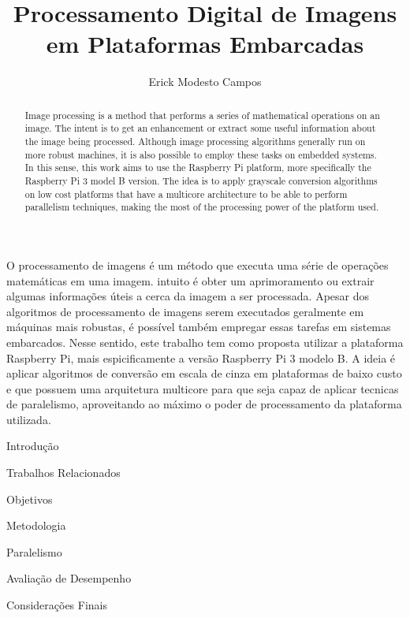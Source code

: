 \documentclass[12pt]{article}
\title{Processamento Digital de Imagens em Plataformas Embarcadas}
\author{Erick Modesto Campos}
\begin{document}
 

\onehalfspace
\maketitle

\begin{abstract}
Image processing is a method that performs a series of mathematical operations
on an image. The intent is to get an enhancement or extract some useful
information about the image being processed. Although image processing
algorithms generally run on more robust machines, it is also possible to employ
these tasks on embedded systems. In this sense, this work aims to use the
Raspberry Pi platform, more specifically the Raspberry Pi 3 model B version. The
idea is to apply grayscale conversion algorithms on low cost platforms that have
a multicore architecture to be able to perform parallelism techniques, making
the most of the processing power of the platform used.
\end{abstract}
     
\begin{resumo} 
O processamento de imagens é um método que executa uma série de operações
matemáticas em uma imagem.  intuito é obter um aprimoramento ou extrair algumas
informações úteis a cerca da imagem a ser processada. Apesar dos algoritmos de
processamento de imagens serem executados geralmente em máquinas mais robustas,
é possível também empregar essas tarefas em sistemas embarcados.  Nesse sentido,
este trabalho tem como proposta utilizar a plataforma Raspberry Pi, mais
espicificamente a versão Raspberry Pi 3 modelo B. A ideia é aplicar algoritmos
de conversão em escala de cinza em plataformas de baixo custo e que possuem uma
arquitetura multicore para que seja capaz de aplicar tecnicas de paralelismo,
aproveitando ao máximo o poder de processamento da plataforma utilizada.
\end{resumo}

\begin{section}{Introdução}

\end{section}
\begin{section}{Trabalhos Relacionados}

\end{section}
\begin{section}{Objetivos}

\end{section}
\begin{section}{Metodologia}

\end{section}
\begin{section}{Paralelismo}

\end{section}
\begin{section}{Avaliação de Desempenho}

\end{section}
\begin{section}{Considerações Finais}

\end{section}



\end{document}

